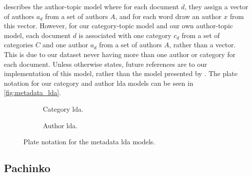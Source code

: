 \citet{author_topic_2012} describes the author-topic model where for each document $d$, they assign a vector of authors $a_d$ from a set of authors $A$, and for each word draw an author $x$ from this vector.
However, for our category-topic model and our own author-topic model, each document $d$ is associated with one category $c_d$ from a set of categories $C$ and one author $a_d$ from a set of authors $A$, rather than a vector.
This is due to our dataset never having more than one author or category for each document.
Unless otherwise states, future references are to our implementation of this model, rather than the model presented by \citet{author_topic_2012}.
The plate notation for our category and author \gls{lda} models can be seen in \autoref{fig:metadata_lda}.

\begin{figure*}[ht]
	\centering
	\begin{subfigure}{0.3\textwidth}
		\centering
		
		\caption{Category \gls{lda}.}
		\label{fig:category_lda}
	\end{subfigure}
	\hspace{5em}
	\begin{subfigure}{0.3\textwidth}
		\centering
		
		\caption{Author \gls{lda}.}
		\label{fig:author_lda}
	\end{subfigure}
	\caption{Plate notation for the metadata \gls{lda} models.}
	\label{fig:metadata_lda}
\end{figure*}

\subsection{Pachinko}

